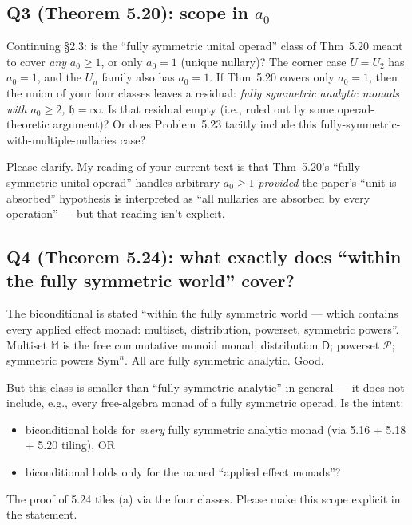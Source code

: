\documentclass[11pt]{article}
\begin{document}
\subsection*{Q3 (Theorem 5.20): scope in $a_0$}

Continuing §2.3: is the ``fully symmetric unital operad'' class of Thm~5.20 meant to cover \emph{any} $a_0 \ge 1$, or only $a_0 = 1$ (unique nullary)? The corner case $U = U_2$ has $a_0 = 1$, and the $U_n$ family also has $a_0 = 1$. If Thm~5.20 covers only $a_0 = 1$, then the union of your four classes leaves a residual: \emph{fully symmetric analytic monads with $a_0 \ge 2$, $\mathfrak{h} = \infty$}. Is that residual empty (i.e., ruled out by some operad-theoretic argument)? Or does Problem~5.23 tacitly include this fully-symmetric-with-multiple-nullaries case?

Please clarify. My reading of your current text is that Thm~5.20's ``fully symmetric unital operad'' handles arbitrary $a_0 \ge 1$ \emph{provided} the paper's ``unit is absorbed'' hypothesis is interpreted as ``all nullaries are absorbed by every operation'' — but that reading isn't explicit.

\subsection*{Q4 (Theorem 5.24): what exactly does ``within the fully symmetric world'' cover?}

The biconditional is stated ``within the fully symmetric world — which contains every applied effect monad: multiset, distribution, powerset, symmetric powers''. Multiset $\mathbb{M}$ is the free commutative monoid monad; distribution $\mathsf{D}$; powerset $\mathcal{P}$; symmetric powers $\mathrm{Sym}^n$. All are fully symmetric analytic. Good.

But this class is smaller than ``fully symmetric analytic'' in general — it does not include, e.g., every free-algebra monad of a fully symmetric operad. Is the intent:
\begin{itemize}[leftmargin=1.5em, itemsep=1pt]
  \item[(a)] biconditional holds for \emph{every} fully symmetric analytic monad (via 5.16 + 5.18 + 5.20 tiling), OR
  \item[(b)] biconditional holds only for the named ``applied effect monads''?
\end{itemize}
The proof of 5.24 tiles (a) via the four classes. Please make this scope explicit in the statement.
\end{document}
